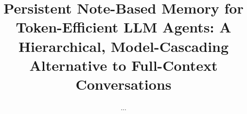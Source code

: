 \documentclass[conference]{IEEEtran}
\begin{document}
\title{Persistent Note-Based Memory for Token-Efficient LLM Agents: A Hierarchical, Model-Cascading Alternative to Full-Context Conversations}

\author{ ...}

\end{document}
